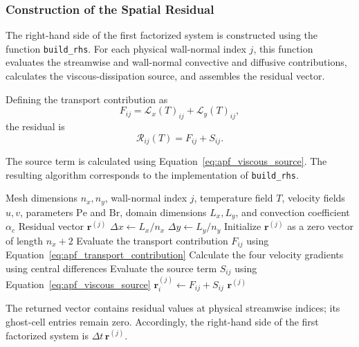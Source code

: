 \subsubsection{Construction of the Spatial Residual}

The right-hand side of the first factorized system is
constructed using the function \texttt{build\_rhs}. For each
physical wall-normal index $j$, this function evaluates the
streamwise and wall-normal convective and diffusive
contributions, calculates the viscous-dissipation source,
and assembles the residual vector.

Defining the transport contribution as
\begin{equation}
F_{ij}
=
\mathcal{L}_x(T)_{ij}
+
\mathcal{L}_y(T)_{ij},
\label{eq:apf_transport_contribution}
\end{equation}
the residual is
\begin{equation}
\mathcal{R}_{ij}(T)=F_{ij}+S_{ij}.
\label{eq:apf_residual_assembly}
\end{equation}

The source term is calculated using Equation~\eqref{eq:apf_viscous_source}. The resulting algorithm corresponds to the implementation
of \texttt{build\_rhs}.

\begin{algorithm}[H]
\caption{Construction of the Spatial Residual Vector}
\label{alg:apf_build_rhs}
\begin{algorithmic}[1]
\Require Mesh dimensions $n_x,n_y$, wall-normal index $j$,
temperature field $T$, velocity fields $u,v$, parameters
$\mathrm{Pe}$ and $\mathrm{Br}$, domain dimensions $L_x,L_y$,
and convection coefficient $\alpha_c$
\Ensure Residual vector $\mathbf{r}^{(j)}$
\State $\Delta x \gets L_x/n_x$
\State $\Delta y \gets L_y/n_y$
\State Initialize $\mathbf{r}^{(j)}$ as a zero vector of
length $n_x+2$
    \State Evaluate the transport contribution
    $F_{ij}$ using Equation~\eqref{eq:apf_transport_contribution}
    \State Calculate the four velocity gradients using
    central differences
    \State Evaluate the source term $S_{ij}$ using
    Equation~\eqref{eq:apf_viscous_source}
    \State $\mathbf{r}^{(j)}_i \gets F_{ij}+S_{ij}$
\EndFor
\State \Return $\mathbf{r}^{(j)}$
\end{algorithmic}
\end{algorithm}

The returned vector contains residual values at physical
streamwise indices; its ghost-cell entries remain zero.
Accordingly, the right-hand side of the first factorized
system is $\Delta t\,\mathbf{r}^{(j)}$.

